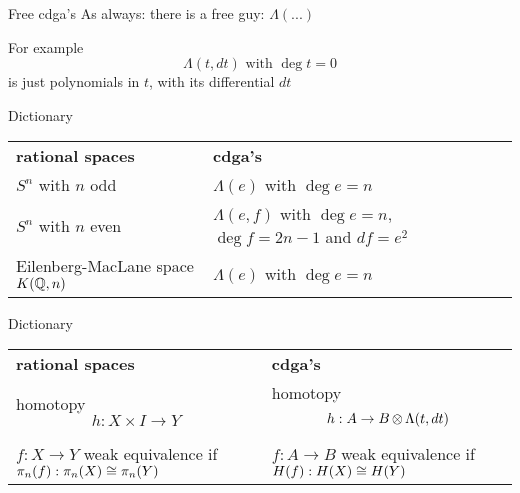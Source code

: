 \documentclass[14pt]{beamer}
\newcommand{\Frame}[2]{
	\begin{frame}{#1}#2\end{frame}
}
\begin{document}
\Frame{Free cdga's}{
	As always: there is a free guy: $\Lambda(...)$

	For example
	\[ \Lambda(t, dt) \text{ with } \deg{t} = 0 \]
	is just polynomials in $t$, with its differential $dt$
}

\newcommand{\Dict}[1]{
	\noindent
	\begin{tabularx}{\textwidth}{ X X }
		{\bf rational spaces} & {\bf cdga's} \\[1em]
		#1
	\end{tabularx}
}

\Frame{Dictionary}{
	\Dict{
		$S^n$ with $n$ odd
				& $\Lambda(e)$ with $\deg{e} = n$ \\[1em]

		$S^n$ with $n$ even
				& $\Lambda(e, f)$ with $\deg{e} = n$, $\deg{f} = 2n-1$ and $d f = e^2$ \\[1em]

		Eilenberg-MacLane space $K(\mathbb{Q}, n)$
				& $\Lambda(e)$ with $\deg{e} = n$
	}
}

\Frame{Dictionary}{
	\Dict{
		homotopy $$h: X \times I \to Y$$
				& homotopy $$h: A \to B \operatorname*{\otimes} \Lambda(t, dt)$$ \\[1em]

		$f: X \to Y$ weak equivalence if $\pi_n(f): \pi_n(X) \cong \pi_n(Y)$
				& $f: A \to B$ weak equivalence if $H(f): H(X) \cong H(Y)$
	}
}
\end{document}
